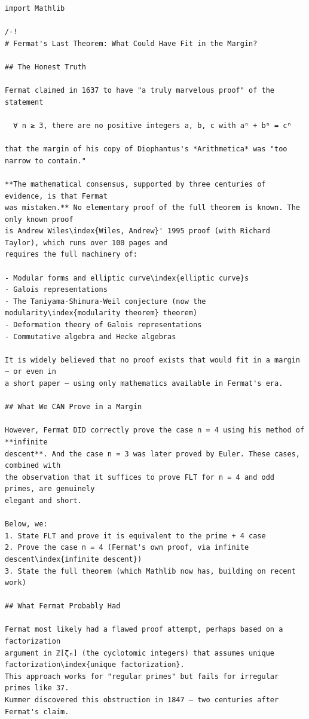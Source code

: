 \documentclass[11pt,openany]{book}
\theoremstyle{definition}
\theoremstyle{plain}
\theoremstyle{remark}
\begin{document}
\begin{lstlisting}[style=lean]
import Mathlib

/-!
# Fermat's Last Theorem: What Could Have Fit in the Margin?

## The Honest Truth

Fermat claimed in 1637 to have "a truly marvelous proof" of the statement

  ∀ n ≥ 3, there are no positive integers a, b, c with aⁿ + bⁿ = cⁿ

that the margin of his copy of Diophantus's *Arithmetica* was "too narrow to contain."

**The mathematical consensus, supported by three centuries of evidence, is that Fermat
was mistaken.** No elementary proof of the full theorem is known. The only known proof
is Andrew Wiles\index{Wiles, Andrew}' 1995 proof (with Richard Taylor), which runs over 100 pages and
requires the full machinery of:

- Modular forms and elliptic curve\index{elliptic curve}s
- Galois representations
- The Taniyama-Shimura-Weil conjecture (now the modularity\index{modularity theorem} theorem)
- Deformation theory of Galois representations
- Commutative algebra and Hecke algebras

It is widely believed that no proof exists that would fit in a margin — or even in
a short paper — using only mathematics available in Fermat's era.

## What We CAN Prove in a Margin

However, Fermat DID correctly prove the case n = 4 using his method of **infinite
descent**. And the case n = 3 was later proved by Euler. These cases, combined with
the observation that it suffices to prove FLT for n = 4 and odd primes, are genuinely
elegant and short.

Below, we:
1. State FLT and prove it is equivalent to the prime + 4 case
2. Prove the case n = 4 (Fermat's own proof, via infinite descent\index{infinite descent})
3. State the full theorem (which Mathlib now has, building on recent work)

## What Fermat Probably Had

Fermat most likely had a flawed proof attempt, perhaps based on a factorization
argument in ℤ[ζₙ] (the cyclotomic integers) that assumes unique factorization\index{unique factorization}.
This approach works for "regular primes" but fails for irregular primes like 37.
Kummer discovered this obstruction in 1847 — two centuries after Fermat's claim.


\end{lstlisting}
\end{document}
